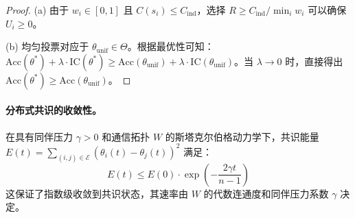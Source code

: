 \begin{proof}
(a) 由于 $w_i \in [0,1]$ 且 $C(s_i) \leq C_{\text{ind}}$，选择 $R \geq C_{\text{ind}} / \min_i w_i$ 可以确保 $U_i \geq 0$。

(b) 均匀投票对应于 $\theta_{\text{unif}} \in \Theta$。根据最优性可知：$\text{Acc}(\theta^*) + \lambda \cdot \text{IC}(\theta^*) \geq \text{Acc}(\theta_{\text{unif}}) + \lambda \cdot \text{IC}(\theta_{\text{unif}})$。当 $\lambda \to 0$ 时，直接得出 $\text{Acc}(\theta^*) \geq \text{Acc}(\theta_{\text{unif}})$。
\end{proof}

\paragraph{分布式共识的收敛性。}
在具有同伴压力 $\gamma > 0$ 和通信拓扑 $W$ 的斯塔克尔伯格动力学下，共识能量 $E(t) = \sum_{(i,j) \in \mathcal{E}} (\theta_i(t) - \theta_j(t))^2$ 满足：
\begin{equation}
    E(t) \leq E(0) \cdot \exp\!\left(-\frac{2\gamma t}{n-1}\right)
\end{equation}
这保证了指数级收敛到共识状态，其速率由 $W$ 的代数连通度和同伴压力系数 $\gamma$ 决定。
